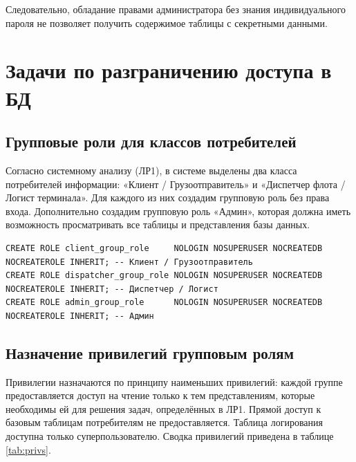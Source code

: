 \documentclass[a4paper,14pt]{article}
\begin{document}
Следовательно, обладание правами администратора без знания индивидуального пароля не позволяет получить содержимое таблицы с секретными данными.

\newpage
\section{Задачи по разграничению доступа в БД}

\subsection{Групповые роли для классов потребителей}
Согласно системному анализу (ЛР1), в системе выделены два класса потребителей информации: «Клиент / Грузоотправитель» и «Диспетчер флота / Логист терминала». Для каждого из них создадим групповую роль без права входа. Дополнительно создадим групповую роль «Админ», которая должна иметь возможность просматривать все таблицы и представления базы данных.

\begin{lstlisting}
CREATE ROLE client_group_role     NOLOGIN NOSUPERUSER NOCREATEDB NOCREATEROLE INHERIT; -- Клиент / Грузоотправитель
CREATE ROLE dispatcher_group_role NOLOGIN NOSUPERUSER NOCREATEDB NOCREATEROLE INHERIT; -- Диспетчер / Логист
CREATE ROLE admin_group_role      NOLOGIN NOSUPERUSER NOCREATEDB NOCREATEROLE INHERIT; -- Админ
\end{lstlisting}

\subsection{Назначение привилегий групповым ролям}
Привилегии назначаются по принципу наименьших привилегий: каждой группе предоставляется доступ на чтение только к тем представлениям, которые необходимы ей для решения задач, определённых в ЛР1. Прямой доступ к базовым таблицам потребителям не предоставляется. Таблица логирования доступна только суперпользователю. Сводка привилегий приведена в таблице \ref{tab:privs}.
\end{document}
